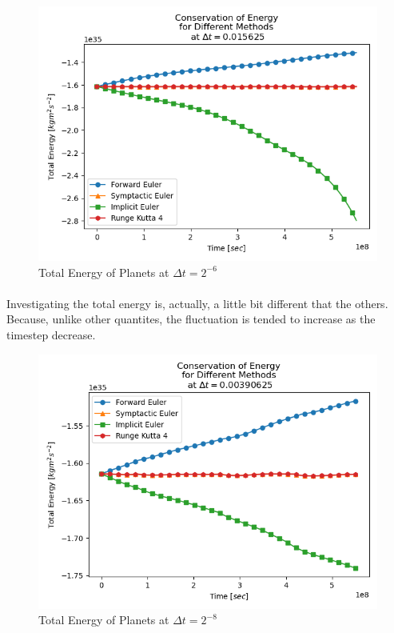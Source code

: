 \documentclass[letterpaper,12pt]{article}
\begin{document}
    \begin{figure}[H]
    \centerline{\includegraphics[width=0.7\linewidth]{figures/40.png}}
    \caption{Total Energy of Planets at $\Delta t = 2^{-6}$}
    \label{fig:40}
    \end{figure}

    \paragraph{} Investigating the total energy is, actually, a little bit different that the others. Because, unlike other quantites, the fluctuation is tended to increase as the timestep decrease.

    \begin{figure}[H]
    \centerline{\includegraphics[width=0.7\linewidth]{figures/41.png}}
    \caption{Total Energy of Planets at $\Delta t = 2^{-8}$}
    \label{fig:41}
    \end{figure}
\end{document}
